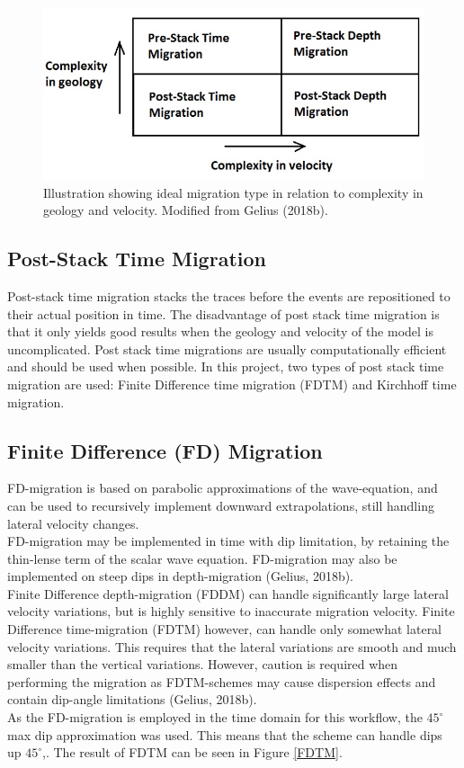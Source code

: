 \documentclass[10pt,a4paper]{article}
\begin{document}
\begin{figure}[H]
\includegraphics[scale=0.4]{types_of_migration.jpg}
\caption{Illustration showing ideal migration type in relation to complexity in geology and velocity. Modified from Gelius (2018b).}
\label{Types}
\end{figure}

\subsection{Post-Stack Time Migration}

\noindent Post-stack time migration stacks the traces before the events are repositioned to their actual position in time. The disadvantage of post stack time migration is that it only yields good results when the geology and velocity of the model is uncomplicated. Post stack time migrations are usually computationally efficient and should be used when possible. In this project, two types of post stack time migration are used: Finite Difference time migration (FDTM) and Kirchhoff time migration.

\subsection{Finite Difference (FD) Migration}

\noindent FD-migration is based on parabolic approximations of the wave-equation, and can be used to recursively implement downward extrapolations, still handling lateral velocity changes.\\
FD-migration may be implemented in time with dip limitation, by retaining the thin-lense term of the scalar wave equation. FD-migration may also be implemented on steep dips in depth-migration (Gelius, 2018b).
\\
Finite Difference depth-migration (FDDM) can handle significantly large lateral velocity variations, but is highly sensitive to inaccurate migration velocity. Finite Difference time-migration (FDTM) however, can handle only somewhat lateral velocity variations. This requires that the lateral variations are smooth and much smaller than the vertical variations. However, caution is required when performing the migration as FDTM-schemes may cause dispersion effects and contain dip-angle limitations (Gelius, 2018b). 
\\
As the FD-migration is employed in the time domain for this workflow, the $45^{\circ}$ max dip approximation was used. This means that the scheme can handle dips up $45^{\circ}$,. The result of FDTM can be seen in Figure \ref{FDTM}.
\end{document}
